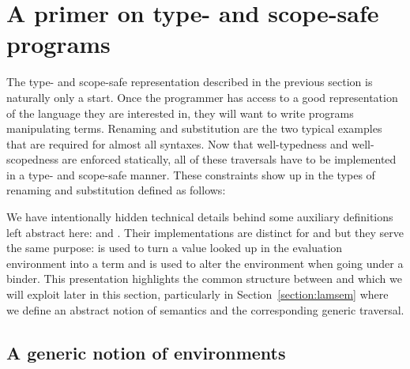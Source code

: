 

\section{A primer on type- and scope-safe programs}\label{section:primer-program}

The type- and scope-safe representation described in the previous
section is naturally only a start. Once the programmer has access to a
good representation of the language they are interested in, they will
want to write programs manipulating terms.  Renaming and substitution
are the two typical examples that are required for almost all
syntaxes. Now that well-typedness and well-scopedness are enforced
statically, all of these traversals have to be implemented in a type-
and scope-safe manner.  These constraints show up in the types of
renaming and substitution defined as follows:

\begin{minipage}{\textwidth}
\begin{minipage}{0.50\textwidth}
\end{minipage}\hfill
\begin{minipage}{0.50\textwidth}
\end{minipage}
\end{minipage}

We have intentionally hidden technical details behind some auxiliary definitions
left abstract here:  and . Their implementations are distinct
for  and  but they serve the same purpose:  is used to
turn a value looked up in the evaluation environment into a term and 
is used to alter the environment when going under a binder. This presentation
highlights the common structure between  and  which we will exploit
later in this section, particularly in Section~\ref{section:lamsem}
where we define an abstract notion of semantics and the corresponding generic traversal.

\subsection{A generic notion of environments}\label{sec:genenvironment}

